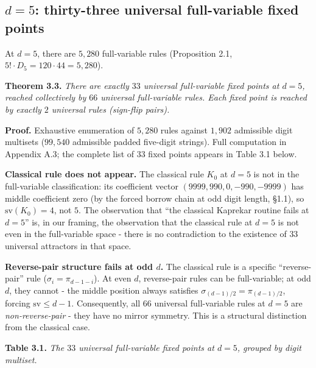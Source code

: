 \documentclass[11pt,letterpaper]{article}
\theoremstyle{paperstyle}
\theoremstyle{paperstyledef}
\theoremstyle{paperstylerem}
\begin{document}
\hypertarget{d-5-thirty-three-universal-full-variable-fixed-points}{%
\subsection{\texorpdfstring{\(d = 5\): thirty-three universal full-variable fixed points}{d = 5: thirty-three universal full-variable fixed points}}\label{d-5-thirty-three-universal-full-variable-fixed-points}}

At \(d = 5\), there are \(5{,}280\) full-variable rules (Proposition
2.1, \(5! \cdot D_5 = 120 \cdot 44 = 5{,}280\)).

\textbf{Theorem 3.3.} \emph{There are exactly \(33\) universal
full-variable fixed points at \(d = 5\), reached collectively by \(66\)
universal full-variable rules. Each fixed point is reached by exactly
\(2\) universal rules (sign-flip pairs).}

\textbf{Proof.} Exhaustive enumeration of \(5{,}280\) rules against
\(1{,}902\) admissible digit multisets (\(99{,}540\) admissible padded
five-digit strings). Full computation in Appendix A.3; the complete list
of \(33\) fixed points appears in Table 3.1 below.

\textbf{Classical rule does not appear.} The classical rule \(K_0\) at
\(d = 5\) is not in the full-variable classification: its coefficient
vector \((9999, 990, 0, -990, -9999)\) has middle coefficient zero (by
the forced borrow chain at odd digit length, §1.1), so
\(\mathrm{sv}(K_0) = 4\), not \(5\). The observation that ``the
classical Kaprekar routine fails at \(d = 5\)'' is, in our framing, the
observation that the classical rule at \(d = 5\) is not even in the
full-variable space - there is no contradiction to the existence of
\(33\) universal attractors in that space.

\textbf{Reverse-pair structure fails at odd \(d\).} The classical rule
is a specific ``reverse-pair'' rule (\(\sigma_i = \pi_{d-1-i}\)). At
even \(d\), reverse-pair rules can be full-variable; at odd \(d\), they
cannot - the middle position always satisfies
\(\sigma_{(d-1)/2} = \pi_{(d-1)/2}\), forcing
\(\mathrm{sv} \leq d - 1\). Consequently, all \(66\) universal
full-variable rules at \(d = 5\) are \emph{non-reverse-pair} - they
have no mirror symmetry. This is a structural distinction from the
classical case.

\textbf{Table 3.1.} \emph{The \(33\) universal full-variable fixed
points at \(d = 5\), grouped by digit multiset.}
\end{document}
